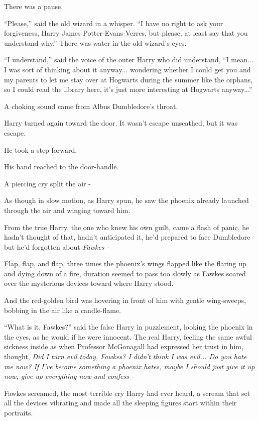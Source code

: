 There was a pause.

``Please,'' said the old wizard in a whisper. ``I have no right to ask
your forgiveness, Harry James Potter-Evans-Verres, but please, at least
say that you understand why.'' There was water in the old wizard's eyes.

``I understand,'' said the voice of the outer Harry who did understand,
``I mean... I was sort of thinking about it anyway...
wondering whether I could get you and my parents to let me stay over at
Hogwarts during the summer like the orphans, so I could read the library
here, it's just more interesting at Hogwarts anyway...''

A choking sound came from Albus Dumbledore's throat.

Harry turned again toward the door. It wasn't escape unscathed, but it
was escape.

He took a step forward.

His hand reached to the door-handle.

A piercing cry split the air -

As though in slow motion, as Harry spun, he saw the phoenix already
launched through the air and winging toward him.

From the true Harry, the one who knew his own guilt, came a flash of
panic, he hadn't thought of that, hadn't anticipated it, he'd prepared
to face Dumbledore but he'd forgotten about \emph{Fawkes -}

Flap, flap, and flap, three times the phoenix's wings flapped like the
flaring up and dying down of a fire, duration seemed to pass too slowly
as Fawkes soared over the mysterious devices toward where Harry stood.

And the red-golden bird was hovering in front of him with gentle
wing-sweeps, bobbing in the air like a candle-flame.

``What is it, Fawkes?'' said the false Harry in puzzlement, looking the
phoenix in the eyes, as he would if he were innocent. The real Harry,
feeling the same awful sickness inside as when Professor McGonagall had
expressed her trust in him, thought, \emph{Did I turn evil today,
Fawkes? I didn't think I was evil... Do you hate me now? If I've
become something a phoenix hates, maybe I should just give it up now,
give up everything now and confess -}

Fawkes screamed, the most terrible cry Harry had ever heard, a scream
that set all the devices vibrating and made all the sleeping figures
start within their portraits.


